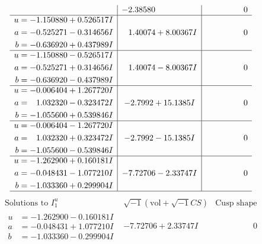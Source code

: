 \documentclass[1p]{elsarticle_modified}
\theoremstyle{definition}
\newcommand{\I}{\sqrt{-1}}
\begin{document}
$$\begin{array}{c|c|c}
 & -2.38580\phantom{ +0.000000I} & \phantom{-0.000000 } 0 \\ \hline\begin{aligned}
u &= -1.150880 + 0.526517 I \\
a &= -0.525271 - 0.314656 I \\
b &= -0.636920 + 0.437989 I\end{aligned}
 & \phantom{-}1.40074 + 8.00367 I & \phantom{-0.000000 } 0 \\ \hline\begin{aligned}
u &= -1.150880 - 0.526517 I \\
a &= -0.525271 + 0.314656 I \\
b &= -0.636920 - 0.437989 I\end{aligned}
 & \phantom{-}1.40074 - 8.00367 I & \phantom{-0.000000 } 0 \\ \hline\begin{aligned}
u &= -0.006404 + 1.267720 I \\
a &= \phantom{-}1.032320 - 0.323472 I \\
b &= -1.055600 + 0.539846 I\end{aligned}
 & -2.7992 + 15.1385 I & \phantom{-0.000000 } 0 \\ \hline\begin{aligned}
u &= -0.006404 - 1.267720 I \\
a &= \phantom{-}1.032320 + 0.323472 I \\
b &= -1.055600 - 0.539846 I\end{aligned}
 & -2.7992 - 15.1385 I & \phantom{-0.000000 } 0 \\ \hline\begin{aligned}
u &= -1.262900 + 0.160181 I \\
a &= -0.048431 - 1.077210 I \\
b &= -1.033360 + 0.299904 I\end{aligned}
 & -7.72706 - 2.33747 I & \phantom{-0.000000 } 0\\
 \hline 
 \end{array}$$\newpage$$\begin{array}{c|c|c}  
\text{Solutions to }I^u_{1}& \I (\text{vol} + \sqrt{-1}CS) & \text{Cusp shape}\\
 \hline 
\begin{aligned}
u &= -1.262900 - 0.160181 I \\
a &= -0.048431 + 1.077210 I \\
b &= -1.033360 - 0.299904 I\end{aligned}
 & -7.72706 + 2.33747 I & \phantom{-0.000000 } 0 \\ \hline\begin{aligned}

\end{aligned}
\end{array}$$
\end{document}
